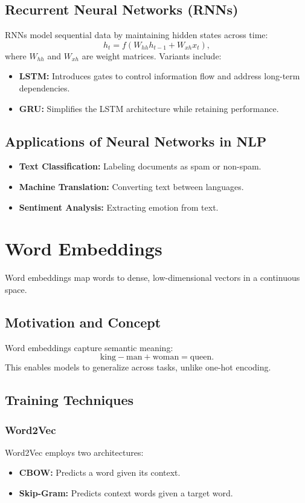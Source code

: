 \subsection{Recurrent Neural Networks (RNNs)}
RNNs model sequential data by maintaining hidden states across time:
\[
h_t = f(W_{hh} h_{t-1} + W_{xh} x_t),
\]
where \(W_{hh}\) and \(W_{xh}\) are weight matrices. Variants include:
\begin{itemize}
    \item \textbf{LSTM:} Introduces gates to control information flow and address long-term dependencies.
    \item \textbf{GRU:} Simplifies the LSTM architecture while retaining performance.
\end{itemize}

\subsection{Applications of Neural Networks in NLP}
\begin{itemize}
    \item \textbf{Text Classification:} Labeling documents as spam or non-spam.
    \item \textbf{Machine Translation:} Converting text between languages.
    \item \textbf{Sentiment Analysis:} Extracting emotion from text.
\end{itemize}

\section{Word Embeddings}
Word embeddings map words to dense, low-dimensional vectors in a continuous space.

\subsection{Motivation and Concept}
Word embeddings capture semantic meaning:
\[
\text{king} - \text{man} + \text{woman} = \text{queen}.
\]
This enables models to generalize across tasks, unlike one-hot encoding.

\subsection{Training Techniques}
\subsubsection{Word2Vec}
Word2Vec employs two architectures:
\begin{itemize}
    \item \textbf{CBOW:} Predicts a word given its context.
    \item \textbf{Skip-Gram:} Predicts context words given a target word.
\end{itemize}

